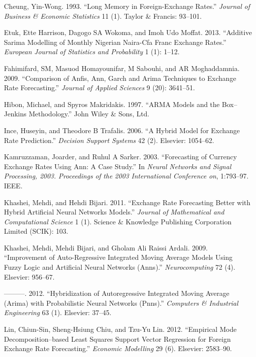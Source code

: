 \documentclass[12pt,a4paper]{article}
\numberwithin{equation}{section}
\numberwithin{figure}{section}
\numberwithin{table}{section}
\begin{document}
\hypertarget{ref-cheung1993}{}
Cheung, Yin-Wong. 1993. ``Long Memory in Foreign-Exchange Rates.''
\emph{Journal of Business \& Economic Statistics} 11 (1). Taylor \&
Francis: 93--101.

\hypertarget{ref-etuk2013}{}
Etuk, Ette Harrison, Dagogo SA Wokoma, and Imoh Udo Moffat. 2013.
``Additive Sarima Modelling of Monthly Nigerian Naira-Cfa Franc Exchange
Rates.'' \emph{European Journal of Statistics and Probability} 1 (1):
1--12.

\hypertarget{ref-fahimifard2009}{}
Fahimifard, SM, Masuod Homayounifar, M Sabouhi, and AR Moghaddamnia.
2009. ``Comparison of Anfis, Ann, Garch and Arima Techniques to Exchange
Rate Forecasting.'' \emph{Journal of Applied Sciences} 9 (20): 3641--51.

\hypertarget{ref-spyros1997}{}
Hibon, Michael, and Spyros Makridakis. 1997. ``ARMA Models and the
Box--Jenkins Methodology.'' John Wiley \& Sons, Ltd.

\hypertarget{ref-ince2006}{}
Ince, Huseyin, and Theodore B Trafalis. 2006. ``A Hybrid Model for
Exchange Rate Prediction.'' \emph{Decision Support Systems} 42 (2).
Elsevier: 1054--62.

\hypertarget{ref-kamruzzaman2003}{}
Kamruzzaman, Joarder, and Ruhul A Sarker. 2003. ``Forecasting of
Currency Exchange Rates Using Ann: A Case Study.'' In \emph{Neural
Networks and Signal Processing, 2003. Proceedings of the 2003
International Conference on}, 1:793--97. IEEE.

\hypertarget{ref-khashei2011}{}
Khashei, Mehdi, and Hehdi Bijari. 2011. ``Exchange Rate Forecasting
Better with Hybrid Artificial Neural Networks Models.'' \emph{Journal of
Mathematical and Computational Science} 1 (1). Science \& Knowledge
Publishing Corporation Limited (SCIK): 103.

\hypertarget{ref-khashei2009}{}
Khashei, Mehdi, Mehdi Bijari, and Gholam Ali Raissi Ardali. 2009.
``Improvement of Auto-Regressive Integrated Moving Average Models Using
Fuzzy Logic and Artificial Neural Networks (Anns).''
\emph{Neurocomputing} 72 (4). Elsevier: 956--67.

\hypertarget{ref-khashei2012}{}
---------. 2012. ``Hybridization of Autoregressive Integrated Moving
Average (Arima) with Probabilistic Neural Networks (Pnns).''
\emph{Computers \& Industrial Engineering} 63 (1). Elsevier: 37--45.

\hypertarget{ref-lin2012}{}
Lin, Chiun-Sin, Sheng-Hsiung Chiu, and Tzu-Yu Lin. 2012. ``Empirical
Mode Decomposition--based Least Squares Support Vector Regression for
Foreign Exchange Rate Forecasting.'' \emph{Economic Modelling} 29 (6).
Elsevier: 2583--90.
\end{document}

